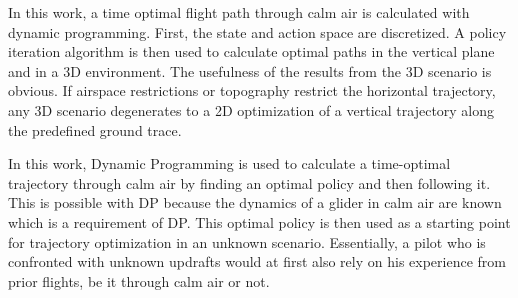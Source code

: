 In this work, a time optimal flight path through calm air is calculated with dynamic programming. First, the state and action space are discretized. A policy iteration algorithm is then used to calculate optimal paths in the vertical plane and in a 3D environment. The usefulness of the results from the 3D scenario is obvious. If airspace restrictions or topography restrict the horizontal trajectory, any 3D scenario degenerates to a 2D optimization of a vertical trajectory along the predefined ground trace.

In this work, Dynamic Programming is used to calculate a time-optimal trajectory through calm air by finding an optimal policy and then following it. This is possible with DP because the dynamics of a glider in calm air are known which is a requirement of DP.
This optimal policy is then used as a starting point for trajectory optimization in an unknown scenario. Essentially, a pilot who is confronted with unknown updrafts would at first also rely on his experience from prior flights, be it through calm air or not.
 